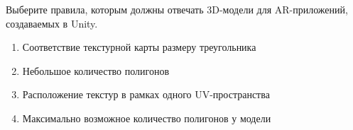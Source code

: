 
Выберите правила, которым должны отвечать 3D-модели для AR-приложений, создаваемых в Unity.

\begin{enumerate}
    \item Соответствие текстурной карты размеру треугольника
    \item Небольшое количество полигонов
    \item Расположение текстур в рамках одного UV-пространства
    \item Максимально возможное количество полигонов у модели
\end{enumerate}

